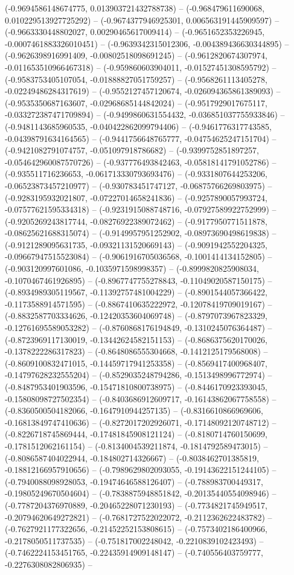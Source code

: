 (-0.9694586148674775, 0.013903721432788738) -- (-0.968479611690068, 0.010229513927725292) -- (-0.9674377946925301, 0.006563191445909597) -- (-0.9663330448802027, 0.00290465617009414) -- (-0.9651652353226945, -0.0007461883326010451) -- (-0.9639342315012306, -0.004389436630344895) -- (-0.9626398916991409, -0.00802518098691245) -- (-0.9612820674307974, -0.011653510966467318) -- (-0.959860603904011, -0.01527451308595792) -- (-0.9583753405107054, -0.01888827051759257) -- (-0.9568261113405278, -0.02249486284317619) -- (-0.9552127457120674, -0.026094365861389093) -- (-0.9535350687163607, -0.02968685144842024) -- (-0.9517929017675117, -0.033272387471709894) -- (-0.9499860631554432, -0.036851037755933846) -- (-0.9481143685960535, -0.040422862099794406) -- (-0.9461776317743585, -0.04398791634164565) -- (-0.9441756648765777, -0.04754625247151704) -- (-0.9421082791074757, -0.051097918786682) -- (-0.9399752851897257, -0.054642960087570726) -- (-0.937776493842463, -0.05818141791052786) -- (-0.935511716236653, -0.061713330793693476) -- (-0.9331807644253206, -0.06523873457210977) -- (-0.930783451747127, -0.06875766269803975) -- (-0.9283195932021807, -0.07227014658241836) -- (-0.9257890057993724, -0.07577621595334318) -- (-0.9231915088748716, -0.07927589922752999) -- (-0.9205269243817744, -0.08276922389072462) -- (-0.9177950771511878, -0.08625621688315074) -- (-0.9149957951252902, -0.08973690498619838) -- (-0.9121289095631735, -0.09321131520669143) -- (-0.9091942552204325, -0.09667947515523084) -- (-0.9061916705036568, -0.1001414134152805) -- (-0.903120997601086, -0.1035971598998357) -- (-0.8999820825908034, -0.1070467461926895) -- (-0.8967747755278843, -0.11049020587150175) -- (-0.8934989305119567, -0.11392757481004229) -- (-0.8901544057366422, -0.1173588914571595) -- (-0.8867410635222972, -0.12078419709019167) -- (-0.8832587703334626, -0.12420353604069748) -- (-0.8797073967823329, -0.12761695589053282) -- (-0.8760868176194849, -0.1310245076364487) -- (-0.8723969117130019, -0.13442624582151153) -- (-0.8686375620170026, -0.1378222286317823) -- (-0.8648086555304668, -0.1412125179568008) -- (-0.8609100832471015, -0.14459717941253358) -- (-0.8569417400968407, -0.14797628232555204) -- (-0.8529035248794286, -0.1513498996772974) -- (-0.8487953401903596, -0.15471810800738975) -- (-0.8446170923393045, -0.15808098727502354) -- (-0.8403686912609717, -0.16143862067758558) -- (-0.8360500504182066, -0.1647910944257135) -- (-0.8316610866969606, -0.16813849747410636) -- (-0.8272017202926071, -0.17148092120748712) -- (-0.8226718745869444, -0.17481845908121124) -- (-0.8180714760150699, -0.1781512062161154) -- (-0.8134004539211874, -0.1814792589473015) -- (-0.8086587404022944, -0.184802714326667) -- (-0.8038462701385819, -0.18812166957910656) -- (-0.7989629802093055, -0.19143622151244105) -- (-0.7940088098928053, -0.19474646588126407) -- (-0.788983700449317, -0.19805249670504604) -- (-0.7838875948851842, -0.20135440554098946) -- (-0.7787204376970889, -0.20465228071230193) -- (-0.7734821745949517, -0.20794620649272821) -- (-0.7681727522022072, -0.2112362622483782) -- (-0.7627921177322656, -0.21452252153808615) -- (-0.7573402186400966, -0.2178050511737535) -- (-0.751817002248042, -0.2210839102423493) -- (-0.7462224153451765, -0.22435914909148147) -- (-0.740556403759777, -0.2276308082806935) -- 